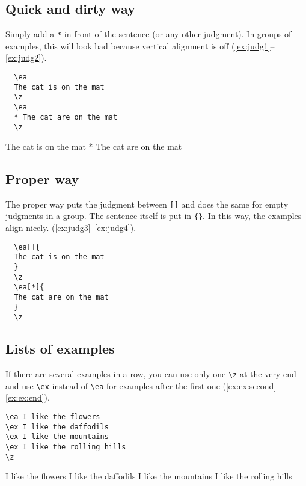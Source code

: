 \documentclass[output=guidelines]{langscibook}
\newcommand{\cmd}[1]{\texttt{\textbackslash#1}}
\begin{document}
\subsection{Quick and dirty way}  
Simply add a \texttt{*} in front of the sentence (or any other judgment). In groups of examples, this will look bad because vertical alignment is off (\ref{ex:judg1}--\ref{ex:judg2}).

\begin{minipage}{.45\textwidth}
\begin{lstlisting}
  \ea 
  The cat is on the mat
  \z
  \ea 
  * The cat are on the mat
  \z
\end{lstlisting}
\end{minipage}
\parbox[b]{.45\textwidth}{
  \ea\label{ex:judg1} 
  The cat is on the mat
  \z
  \ea\label{ex:judg2} 
  * The cat are on the mat
  \z
  }
  
\subsection{Proper way}  
The proper way puts the judgment between \texttt{[]} and does the same for empty judgments in a group. The sentence itself is put in \texttt{\{\}}. In this way, the examples align nicely. (\ref{ex:judg3}--\ref{ex:judg4}).
  
\begin{minipage}{.45\textwidth}
\begin{lstlisting}
  \ea[]{ 
  The cat is on the mat
  }
  \z 
  \ea[*]{ 
  The cat are on the mat
  }
  \z
\end{lstlisting}
\end{minipage}
\parbox[b]{.45\textwidth}{
  \z 
  \z
  }
  
 
\subsection{Lists of examples}
If there are several examples in a row, you can use only one \cmd{z} at the very end and use \cmd{ex} instead of \cmd{ea} for examples after the first one (\ref{ex:ex:second}--\ref{ex:ex:end}).

\begin{minipage}{.45\textwidth}
\begin{lstlisting}
\ea I like the flowers
\ex I like the daffodils
\ex I like the mountains
\ex I like the rolling hills
\z
\end{lstlisting}
\end{minipage}
\parbox{.45\textwidth}{
\ea I like the flowers\label{ex:ex:start}
\ex I like the daffodils\label{ex:ex:second}
\ex I like the mountains
\ex I like the rolling hills\label{ex:ex:end}
\z
}
\end{document}
